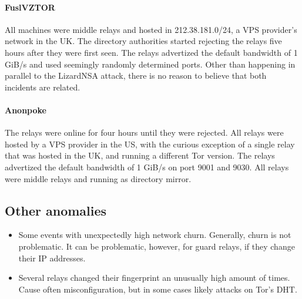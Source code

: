 \paragraph{FuslVZTOR}
All machines were middle relays and hosted in 212.38.181.0/24, a VPS provider's
network in the UK.  The directory authorities started rejecting the relays five
hours after they were first seen.  The relays advertized the default bandwidth
of 1 GiB/s and used seemingly randomly determined ports.  Other than happening
in parallel to the LizardNSA attack, there is no reason to believe that both
incidents are related.

\paragraph{Anonpoke}
The relays were online for four hours until they were rejected.  All relays were
hosted by a VPS provider in the US, with the curious exception of a single relay
that was hosted in the UK, and running a different Tor version.  The relays
advertized the default bandwidth of 1 GiB/s on port 9001 and 9030.  All relays
were middle relays and running as directory mirror.

\subsection{Other anomalies}
\begin{itemize}
	\item Some events with unexpectedly high network churn.  Generally, churn
		is not problematic.  It can be problematic, however, for guard relays,
		if they change their IP addresses.

	\item Several relays changed their fingerprint an unusually high amount of
		times.  Cause often misconfiguration, but in some cases likely attacks
		on Tor's DHT.
\end{itemize}
